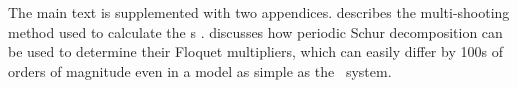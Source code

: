 The main text is supplemented with two appendices.  describes the multi-shooting 
method used to calculate the \rpo s
. 
 discusses how periodic Schur decomposition can be used to determine their Floquet 
multipliers, which can easily differ by 100s of orders of magnitude even in a model as simple as 
the \twomode\ system.
